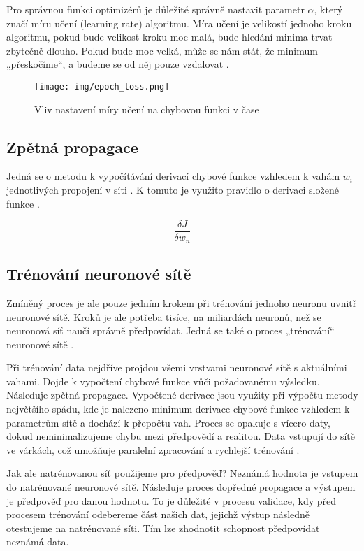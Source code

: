 \documentclass[FM,DP]{tulthesis}
\begin{document}
		Pro správnou funkci optimizérů je důležité správně nastavit parametr $\alpha$, který značí míru učení (learning rate) algoritmu. Míra učení je velikostí jednoho kroku algoritmu, pokud bude velikost kroku moc malá, bude hledání minima trvat zbytečně dlouho. Pokud bude moc velká, může se nám stát, že minimum „přeskočíme“, a budeme se od něj pouze vzdalovat \cite{gradient_descent}.
		
		\begin{figure}[H]
			\centering
			\texttt{[image: img/epoch\_loss.png]}
			\caption{Vliv nastavení míry učení na chybovou funkci v čase \cite{general}}
			\label{fig:loss_time}
		\end{figure}
		
		\subsection{Zpětná propagace}
		Jedná se o metodu k vypočítávání derivací chybové funkce vzhledem k vahám $w_i$ jednotlivých propojení v síti \cite{nielsen2015neural} \cite{brilliant}. K tomuto je využito pravidlo o derivaci složené funkce \cite{profoundqa}. %
		

			\begin{equation}
				\frac{\delta J}{\delta w_n}
			\end{equation}

		
		\subsection{Trénování neuronové sítě}
		Zmíněný proces je ale pouze jedním krokem při trénování jednoho neuronu uvnitř neuronové sítě. Kroků je ale potřeba tisíce, na miliardách neuronů, než se neuronová síť naučí správně předpovídat. Jedná se také o proces „trénování“ neuronové sítě \cite{tds_train}.
		
		Při trénování data nejdříve projdou všemi vrstvami neuronové sítě s aktuálními vahami. Dojde k vypočtení chybové funkce vůči požadovanému výsledku. Následuje zpětná propagace. Vypočtené derivace jsou využity při výpočtu metody největšího spádu, kde je nalezeno minimum derivace chybové funkce vzhledem k parametrům sítě a dochází k přepočtu vah. Proces se opakuje s vícero daty, dokud neminimalizujeme chybu mezi předpovědí a realitou. Data vstupují do sítě ve várkách, což umožňuje paralelní zpracování a rychlejší trénování \cite{tds_train}. 
		
		Jak ale natrénovanou síť použijeme pro předpověď? Neznámá hodnota je vstupem do natrénované neuronové sítě. Následuje proces dopředné propagace a výstupem je předpověď pro danou hodnotu. To je důležité v procesu validace, kdy před procesem trénování odebereme část našich dat, jejichž výstup následně otestujeme na natrénované síti. Tím lze zhodnotit schopnost předpovídat neznámá data.
		
\end{document}
